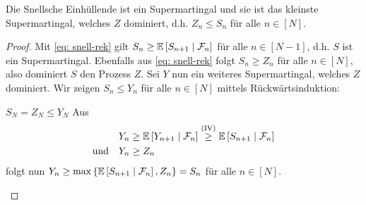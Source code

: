 \begin{theorem} %
	\label{theorem: 6.3}
	Die Snellsche Einhüllende ist ein Supermartingal und sie ist das kleinste Supermartingal, welches $Z$ dominiert, d.h. $Z_n \le S_n$ für alle $n \in [N]$.
\end{theorem}
\begin{proof}
	Mit \eqref{eq: snell-rek} gilt $S_n \ge \mathbb{E} \left[ S_{n+1} \mid \mathcal{F}_n \right]$ für alle $n \in [N-1]$, d.h. $S$ ist ein Supermartingal. Ebenfalls aus \eqref{eq: snell-rek} folgt $S_n \ge Z_n$ für alle $n \in [N]$, also dominiert $S$ den Prozess $Z$. Sei $Y$ nun ein weiteres Supermartingal, welches $Z$ dominiert. Wir zeigen $S_n \le Y_n$ für alle $n \in [N]$ mittels Rückwärtsinduktion:
	\begin{induction}
		\ianfang[$n = N$] $S_N = Z_N \le Y_N$
		\ischritt[$n+1 \to n$] Aus
		\begin{equation*}
			\begin{aligned}
			Y_n &\ge \mathbb{E} \left[ Y_{n+1} \mid \mathcal{F}_n \right] \overset{\text{(IV)}}{\ge} \mathbb{E} \left[ S_{n+1} \mid \mathcal{F}_n \right] \\
			\text{und} \quad Y_n &\ge Z_n
			\end{aligned}
		\end{equation*}
		folgt nun $Y_n \ge \max\left\{ \mathbb{E} \left[ S_{n+1} \mid \mathcal{F}_n \right], Z_n \right\} = S_n$ für alle $n \in [N]$.
	\end{induction}
\end{proof}

